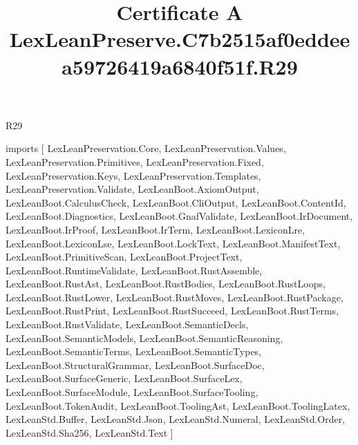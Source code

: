 \begin{lexlean}{R29}
\title{Certificate A LexLeanPreserve.C7b2515af0eddeea59726419a6840f51f.R29}
\begin{coremodule}
imports [
  LexLeanPreservation.Core,
  LexLeanPreservation.Values,
  LexLeanPreservation.Primitives,
  LexLeanPreservation.Fixed,
  LexLeanPreservation.Keys,
  LexLeanPreservation.Templates,
  LexLeanPreservation.Validate,
  LexLeanBoot.AxiomOutput,
  LexLeanBoot.CalculusCheck,
  LexLeanBoot.CliOutput,
  LexLeanBoot.ContentId,
  LexLeanBoot.Diagnostics,
  LexLeanBoot.GnafValidate,
  LexLeanBoot.IrDocument,
  LexLeanBoot.IrProof,
  LexLeanBoot.IrTerm,
  LexLeanBoot.LexiconLre,
  LexLeanBoot.LexiconLse,
  LexLeanBoot.LockText,
  LexLeanBoot.ManifestText,
  LexLeanBoot.PrimitiveScan,
  LexLeanBoot.ProjectText,
  LexLeanBoot.RuntimeValidate,
  LexLeanBoot.RustAssemble,
  LexLeanBoot.RustAst,
  LexLeanBoot.RustBodies,
  LexLeanBoot.RustLoops,
  LexLeanBoot.RustLower,
  LexLeanBoot.RustMoves,
  LexLeanBoot.RustPackage,
  LexLeanBoot.RustPrint,
  LexLeanBoot.RustSucceed,
  LexLeanBoot.RustTerms,
  LexLeanBoot.RustValidate,
  LexLeanBoot.SemanticDecls,
  LexLeanBoot.SemanticModels,
  LexLeanBoot.SemanticReasoning,
  LexLeanBoot.SemanticTerms,
  LexLeanBoot.SemanticTypes,
  LexLeanBoot.StructuralGrammar,
  LexLeanBoot.SurfaceDoc,
  LexLeanBoot.SurfaceGeneric,
  LexLeanBoot.SurfaceLex,
  LexLeanBoot.SurfaceModule,
  LexLeanBoot.SurfaceTooling,
  LexLeanBoot.TokenAudit,
  LexLeanBoot.ToolingAst,
  LexLeanBoot.ToolingLatex,
  LexLeanStd.Buffer,
  LexLeanStd.Json,
  LexLeanStd.Numeral,
  LexLeanStd.Order,
  LexLeanStd.Sha256,
  LexLeanStd.Text
]


\end{coremodule}
\end{lexlean}
